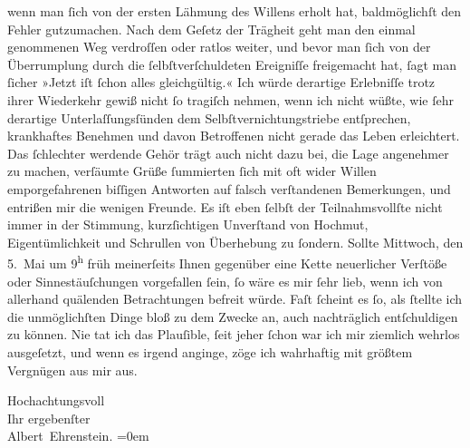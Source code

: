                wenn man{ }ſich von der ersten Lähmung des Willens erholt hat, baldmöglichſt den Fehler
               gutzumachen. Nach dem Geſetz der Trägheit geht man den einmal genommenen Weg
               verdroſſen oder ratlos weiter, und bevor man{ }ſich von der Überrumplung durch die{ }ſelbſtverſchuldeten Ereigniſſe freigemacht hat,{ }ſagt man{ }ſicher »Jetzt iſt{ }ſchon
               alles gleichgültig.« Ich würde derartige Erlebniſſe trotz ihrer Wiederkehr gewiß
               nicht{ }ſo tragiſch nehmen, wenn ich nicht wüßte, wie{ }ſehr derartige
               Unterlaſſungsſünden dem Selbſtvernichtungstriebe entſprechen, krankhaftes Benehmen
               und davon Betroffenen nicht gerade das Leben erleichtert. Das{ }ſchlechter werdende
               Gehör trägt auch nicht dazu bei, {\pb}die Lage
               angenehmer zu machen, verſäumte Grüße{ }ſummierten{ }ſich mit oft wider Willen
               emporgefahrenen biſſigen Antworten auf falsch verſtandenen Bemerkungen, und entrißen
               mir die wenigen Freunde. Es iſt eben{ }ſelbſt der Teilnahmsvollſte nicht immer in der
               Stimmung, kurzſichtigen Unverſtand von Hochmut, Eigentümlichkeit und Schrullen von
               Überhebung zu{ }ſondern. Sollte Mittwoch, den 5. Mai um 9\textsuperscript{h} früh meinerſeits Ihnen gegenüber eine Kette
               neuerlicher Verſtöße oder Sinnestäuſchungen vorgefallen{ }ſein,{ }ſo wäre es mir{ }ſehr
               lieb, wenn ich von allerhand quälenden Betrachtungen befreit würde. Faſt{ }ſcheint es{ }ſo, als{ }ſtellte ich die unmöglichſten Dinge bloß zu dem Zwecke an, auch nachträglich
               entſchuldigen zu können. Nie tat ich das Plauſible,{ }ſeit jeher{ }ſchon war ich mir
               ziemlich wehrlos ausgeſetzt, und wenn es irgend anginge, zöge ich {\pb}wahrhaftig mit größtem Vergnügen aus mir
               aus.\pend
           
\pstart
           Hochachtungsvoll{\\[\baselineskip]}Ihr ergebenſter{\\[\baselineskip]}\spacefill\mbox{Albert Ehrenstein.}\pend
           \leftskip=0em{}\endnumbering{}  \newcommand{\dateiname}{L01840}\newcommand{\titel}{Albert Ehrenstein an Arthur Schnitzler, 6. 5. 1909}\newcommand{\editorInnen}{Martin Anton Müller und Gerd-Hermann Susen}
